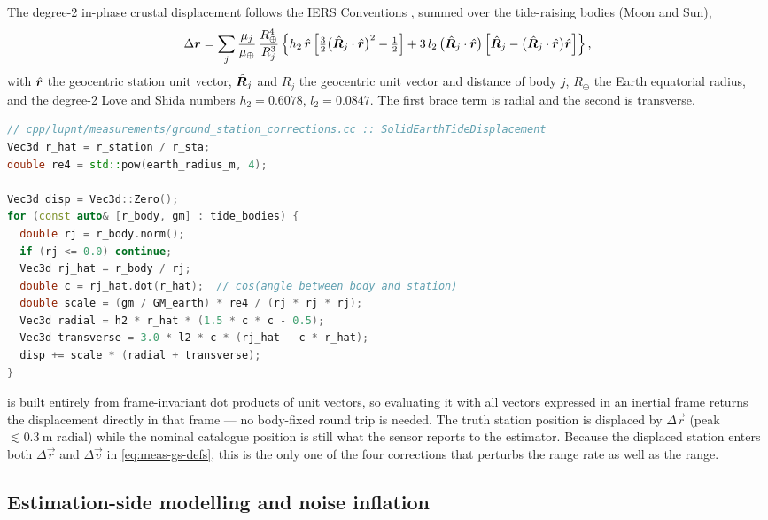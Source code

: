 The degree-2 in-phase crustal displacement follows the IERS Conventions
\citep{iers2010}, summed over the tide-raising bodies (Moon and Sun),
\begin{equation}
  \Delta\bm{r}
  = \sum_j \frac{\mu_j}{\mu_\oplus}\,\frac{R_\oplus^4}{R_j^3}
    \left\{
      h_2\,\hat{\bm{r}}\left[\tfrac{3}{2}\big(\hat{\bm{R}}_j\cdot\hat{\bm{r}}\big)^2
        - \tfrac{1}{2}\right]
      + 3\,l_2\,\big(\hat{\bm{R}}_j\cdot\hat{\bm{r}}\big)
        \left[\hat{\bm{R}}_j - \big(\hat{\bm{R}}_j\cdot\hat{\bm{r}}\big)\hat{\bm{r}}\right]
    \right\},
  \label{eq:meas-tide}
\end{equation}
with $\hat{\bm{r}}$ the geocentric station unit vector, $\hat{\bm{R}}_j$ and $R_j$ the
geocentric unit vector and distance of body $j$, $R_\oplus$ the Earth equatorial
radius, and the degree-2 Love and Shida numbers $h_2 = 0.6078$,
$l_2 = 0.0847$. The first brace term is radial and the second is transverse.

\begin{lstlisting}[language=cpp, caption={Degree-2 in-phase solid Earth tide
  displacement.}, label={lst:meas-tide}]
// cpp/lupnt/measurements/ground_station_corrections.cc :: SolidEarthTideDisplacement
Vec3d r_hat = r_station / r_sta;
double re4 = std::pow(earth_radius_m, 4);

Vec3d disp = Vec3d::Zero();
for (const auto& [r_body, gm] : tide_bodies) {
  double rj = r_body.norm();
  if (rj <= 0.0) continue;
  Vec3d rj_hat = r_body / rj;
  double c = rj_hat.dot(r_hat);  // cos(angle between body and station)
  double scale = (gm / GM_earth) * re4 / (rj * rj * rj);
  Vec3d radial = h2 * r_hat * (1.5 * c * c - 0.5);
  Vec3d transverse = 3.0 * l2 * c * (rj_hat - c * r_hat);
  disp += scale * (radial + transverse);
}
\end{lstlisting}

 is built entirely from frame-invariant dot products of unit
vectors, so evaluating it with all vectors expressed in an inertial frame
returns the displacement directly in that frame --- no body-fixed round trip is
needed. The truth station position is displaced by $\Delta\vec{r}$ (peak
$\lesssim\SI{0.3}{\meter}$ radial) while the nominal catalogue position is
still what the sensor reports to the estimator. Because the displaced station
enters both $\Delta\vec{r}$ and $\Delta\vec{v}$ in \cref{eq:meas-gs-defs}, this
is the only one of the four corrections that perturbs the range rate as well as
the range.

\subsection{Estimation-side modelling and noise inflation}
\label{sec:meas-gs-modelling}

